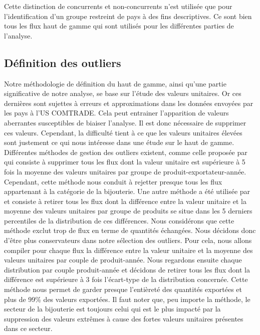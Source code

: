 \documentclass[french,10pt,a4paper]{article}
\begin{document}
Cette distinction de concurrents et non-concurrents n'est utilisée que pour l'identification d'un groupe restreint de pays à des fins descriptives. Ce sont bien tous les flux haut de gamme qui sont utilisés pour les différentes parties de l'analyse.

\subsection{Définition des outliers}

Notre méthodologie de définition du haut de gamme, ainsi qu'une partie significative de notre analyse, se base sur l'étude des valeurs unitaires. Or ces dernières sont sujettes à erreurs et approximations dans les données envoyées par les pays à l'US COMTRADE. Cela peut entrainer l'apparition de valeurs aberrantes susceptibles de biaiser l'analyse. Il est donc nécessaire de supprimer ces valeurs. Cependant, la difficulté tient à ce que les valeurs unitaires élevées sont justement ce qui nous intéresse dans une étude sur le haut de gamme. Différentes méthodes de gestion des outliers existent, comme celle proposée par \cite{Hallak2006} qui consiste à supprimer tous les flux dont la valeur unitaire est supérieure à 5 fois la moyenne des valeurs unitaires par groupe de produit-exportateur-année. Cependant, cette méthode nous conduit à rejetter presque tous les flux appartenant à la catégorie de la bijouterie. Une autre méthode a été utilisée par \cite{Fontagne2013} et consiste à retirer tous les flux dont la différence entre la valeur unitaire et la moyenne des valeurs unitaires par groupe de produits se situe dans les 5 derniers percentiles de la distribution de ces différences. Nous considérons que cette méthode exclut trop de flux en terme de quantités échangées. Nous décidons donc d'être plus conservateurs dans notre sélection des outliers. Pour cela, nous allons compiler pour chaque flux la différence entre la valeur unitaire et la moyenne des valeurs unitaires par couple de produit-année. Nous regardons ensuite chaque distribution par couple produit-année et décidons de retirer tous les flux dont la différence est supérieure à 3 fois l'écart-type de la distribution concernée. Cette méthode nous permet de garder presque l'entièreté des quantités exportées et plus de 99\% des valeurs exportées. Il faut noter que, peu importe la méthode, le secteur de la bijouterie est toujours celui qui est le plus impacté par la suppression des valeurs extrêmes à cause des fortes valeurs unitaires présentes dans ce secteur.
\end{document}
